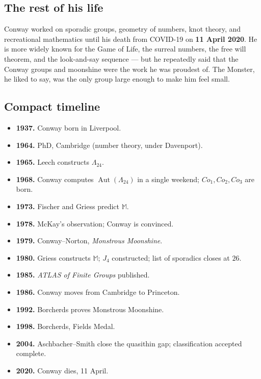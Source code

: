 \documentclass[11pt]{article}
\newcommand{\M}{\mathbb{M}}
\begin{document}
\subsection*{The rest of his life}

Conway worked on sporadic groups, geometry of numbers, knot theory,
and recreational mathematics until his death from COVID-19 on
\textbf{11 April 2020}. He is more widely known for the Game of Life,
the surreal numbers, the free will theorem, and the look-and-say
sequence --- but he repeatedly said that the Conway groups and
moonshine were the work he was proudest of. The Monster, he liked
to say, was the only group large enough to make him feel small.

\subsection*{Compact timeline}

\begin{itemize}[leftmargin=*, itemsep=0pt]
  \item \textbf{1937.} Conway born in Liverpool.
  \item \textbf{1964.} PhD, Cambridge (number theory, under Davenport).
  \item \textbf{1965.} Leech constructs $\Lambda_{24}$.
  \item \textbf{1968.} Conway computes
        $\operatorname{Aut}(\Lambda_{24})$ in a single weekend;
        $\mathit{Co}_1, \mathit{Co}_2, \mathit{Co}_3$ are born.
  \item \textbf{1973.} Fischer and Griess predict $\M$.
  \item \textbf{1978.} McKay's observation; Conway is convinced.
  \item \textbf{1979.} Conway--Norton, \emph{Monstrous Moonshine}.
  \item \textbf{1980.} Griess constructs $\M$; $J_4$ constructed;
        list of sporadics closes at $26$.
  \item \textbf{1985.} \emph{ATLAS of Finite Groups} published.
  \item \textbf{1986.} Conway moves from Cambridge to Princeton.
  \item \textbf{1992.} Borcherds proves Monstrous Moonshine.
  \item \textbf{1998.} Borcherds, Fields Medal.
  \item \textbf{2004.} Aschbacher--Smith close the quasithin gap;
        classification accepted complete.
  \item \textbf{2020.} Conway dies, 11 April.
\end{itemize}
\end{document}
